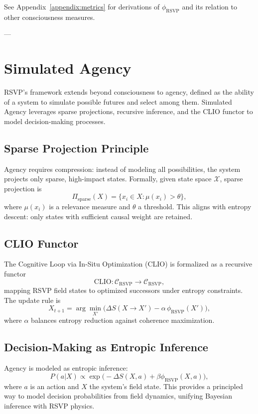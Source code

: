 \documentclass[12pt]{report}
\begin{document}
See Appendix~\ref{appendix:metrics} for derivations of $\phi_{\text{RSVP}}$ and its relation to other consciousness measures.

---

\chapter{Simulated Agency}

RSVP’s framework extends beyond consciousness to agency, defined as the ability of a system to simulate possible futures and select among them.  
Simulated Agency leverages sparse projections, recursive inference, and the CLIO functor to model decision-making processes.

\section{Sparse Projection Principle}

Agency requires compression: instead of modeling all possibilities, the system projects only sparse, high-impact states.  
Formally, given state space $\mathcal{X}$, sparse projection is
\[
\Pi_{\text{sparse}}(X) = \{ x_i \in X : \mu(x_i) > \theta \},
\]
where $\mu(x_i)$ is a relevance measure and $\theta$ a threshold.  
This aligns with entropy descent: only states with sufficient causal weight are retained.

\section{CLIO Functor}

The Cognitive Loop via In-Situ Optimization (CLIO) is formalized as a recursive functor
\[
\text{CLIO} : \mathcal{C}_{\text{RSVP}} \to \mathcal{C}_{\text{RSVP}},
\]
mapping RSVP field states to optimized successors under entropy constraints.  
The update rule is
\[
X_{t+1} = \arg\min_{X'} \Big( \Delta S(X \to X') - \alpha \, \phi_{\text{RSVP}}(X') \Big),
\]
where $\alpha$ balances entropy reduction against coherence maximization.

\section{Decision-Making as Entropic Inference}

Agency is modeled as entropic inference:
\begin{equation}
P(a|X) \propto \exp\!\big( -\Delta S(X,a) + \beta \phi_{\text{RSVP}}(X,a)\big),
\end{equation}
where $a$ is an action and $X$ the system’s field state.  
This provides a principled way to model decision probabilities from field dynamics, unifying Bayesian inference with RSVP physics.
\end{document}
